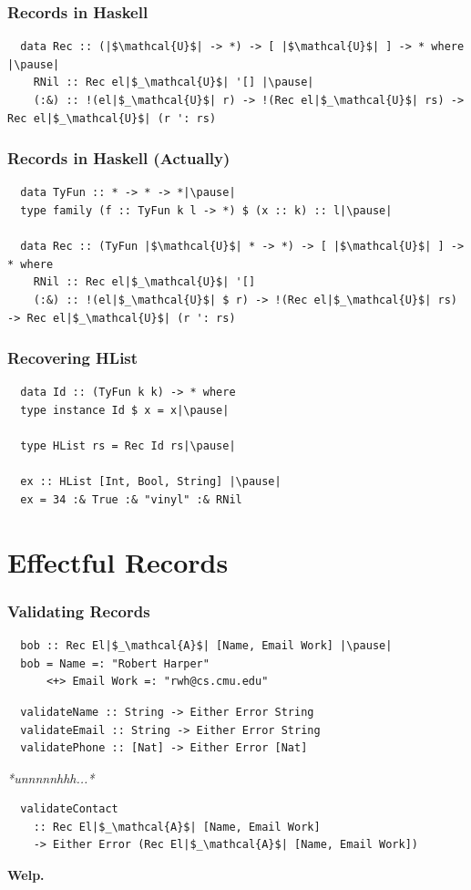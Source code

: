 \documentclass[tikz, 12pt]{beamer}
\begin{document}
\begin{frame}[fragile]
  \frametitle{Records in Haskell}\pause
  \begin{lstlisting}
  data Rec :: (|$\mathcal{U}$| -> *) -> [ |$\mathcal{U}$| ] -> * where |\pause|
    RNil :: Rec el|$_\mathcal{U}$| '[] |\pause|
    (:&) :: !(el|$_\mathcal{U}$| r) -> !(Rec el|$_\mathcal{U}$| rs) -> Rec el|$_\mathcal{U}$| (r ': rs)
  \end{lstlisting}
\end{frame}
\begin{frame}[fragile]
  \frametitle{Records in Haskell (Actually)}\pause

  \begin{lstlisting}
  data TyFun :: * -> * -> *|\pause|
  type family (f :: TyFun k l -> *) $ (x :: k) :: l|\pause|

  data Rec :: (TyFun |$\mathcal{U}$| * -> *) -> [ |$\mathcal{U}$| ] -> * where
    RNil :: Rec el|$_\mathcal{U}$| '[]
    (:&) :: !(el|$_\mathcal{U}$| $ r) -> !(Rec el|$_\mathcal{U}$| rs) -> Rec el|$_\mathcal{U}$| (r ': rs)
  \end{lstlisting}
\end{frame}

\begin{frame}[fragile]
  \frametitle{Recovering HList}\pause
  \begin{lstlisting}
  data Id :: (TyFun k k) -> * where
  type instance Id $ x = x|\pause|

  type HList rs = Rec Id rs|\pause|

  ex :: HList [Int, Bool, String] |\pause|
  ex = 34 :& True :& "vinyl" :& RNil
  \end{lstlisting}
\end{frame}

\section{Effectful Records}

\begin{frame}[fragile]
  \frametitle{Validating Records}

  \begin{lstlisting}
  bob :: Rec El|$_\mathcal{A}$| [Name, Email Work] |\pause|
  bob = Name =: "Robert Harper"
      <+> Email Work =: "rwh@cs.cmu.edu"
  \end{lstlisting}
  \pause
  \begin{lstlisting}
  validateName :: String -> Either Error String
  validateEmail :: String -> Either Error String
  validatePhone :: [Nat] -> Either Error [Nat]
  \end{lstlisting}
  \pause
  \centerline{\textit{*unnnnnhhh...*}}
  \pause
  \begin{lstlisting}
  validateContact
    :: Rec El|$_\mathcal{A}$| [Name, Email Work]
    -> Either Error (Rec El|$_\mathcal{A}$| [Name, Email Work])
  \end{lstlisting}
\end{frame}
\begin{frame}
  \centerline{\textbf{Welp.}}
\end{frame}
\end{document}

